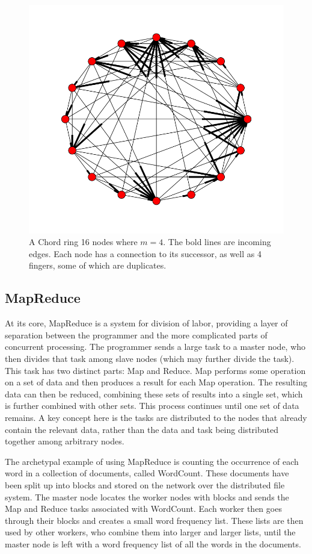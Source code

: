\begin{figure}
    \includegraphics[width=\linewidth]{chordreal}
    \caption{A Chord ring 16 nodes where $m=4$.  The bold lines are incoming edges.  Each node has a connection to its successor, as well as 4 fingers, some of which are duplicates.}
    \label{chordreal}
\end{figure}


\subsection{MapReduce}
At its core, MapReduce \cite{mapreduce} is a system for division of labor, providing a layer of separation between the programmer and the more complicated parts of concurrent processing.  The programmer sends a large task to a master node, who then divides that task among slave nodes (which may further divide the task).  This task has two distinct parts: Map and Reduce.  Map performs some operation on a set of data and then produces a result for each Map operation.  The resulting data can then be reduced, combining these sets of results into a single set, which is further combined with other sets.  This process continues until one set of data remains.  A key concept here is the tasks are distributed to the nodes that already contain the relevant data, rather than the data and task being distributed together among arbitrary nodes.

The archetypal example of using MapReduce is counting the occurrence of each word in a collection of documents, called WordCount.  These documents have been split up into blocks and stored on the network over the distributed file system.  The master node locates the worker nodes with blocks and sends the Map and Reduce tasks associated with WordCount.  Each worker then goes through their blocks and creates a small word frequency list.  These lists are then used by other workers, who combine them into larger and larger lists, until the master node is left with a word frequency list of all the words in the documents. 

